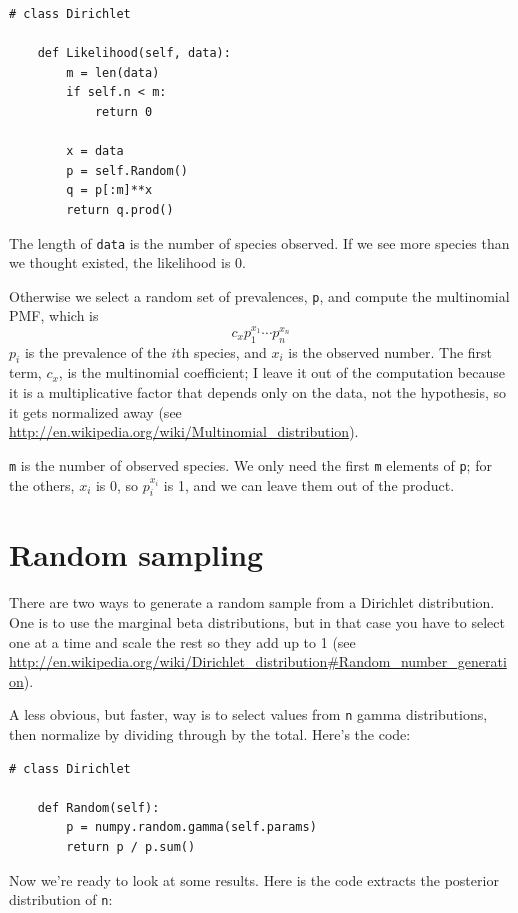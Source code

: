 \documentclass[12pt]{book}
\begin{document}
\begin{verbatim}
# class Dirichlet

    def Likelihood(self, data):
        m = len(data)
        if self.n < m:
            return 0

        x = data
        p = self.Random()
        q = p[:m]**x
        return q.prod()
\end{verbatim}

The length of {\tt data} is the number of species observed.  If
we see more species than we thought existed, the likelihood is 0.

Otherwise we select a random set of prevalences, {\tt p}, and
compute the multinomial PMF, which is
%
\[ c_x  p_1^{x_1} \cdots p_n^{x_n} \]
%
$p_i$ is the prevalence of the $i$th species, and $x_i$ is the
observed number.  The first term, $c_x$, is the multinomial
coefficient; I leave it out of the computation because it is
a multiplicative factor that depends only
on the data, not the hypothesis, so it gets normalized away
(see \url{http://en.wikipedia.org/wiki/Multinomial_distribution}).

{\tt m} is the number of observed species.
We only need the first {\tt m} elements of {\tt p};
for the others, $x_i$ is 0, so
$p_i^{x_i}$ is 1, and we can leave them out of the product.


\section{Random sampling}
\label{randomdir}

There are two ways to generate a random sample from a Dirichlet
distribution.  One is to use the marginal beta distributions, but in
that case you have to select one at a time and scale the rest so they
add up to 1 (see
\url{http://en.wikipedia.org/wiki/Dirichlet_distribution#Random_number_generation}).

A less obvious, but faster, way is to select values from {\tt n} gamma
distributions, then normalize by dividing through by the total. 
Here's the code:

\begin{verbatim}
# class Dirichlet

    def Random(self):
        p = numpy.random.gamma(self.params)
        return p / p.sum()
\end{verbatim}

Now we're ready to look at some results.  Here is the code extracts
the posterior distribution of {\tt n}:
\end{document}
